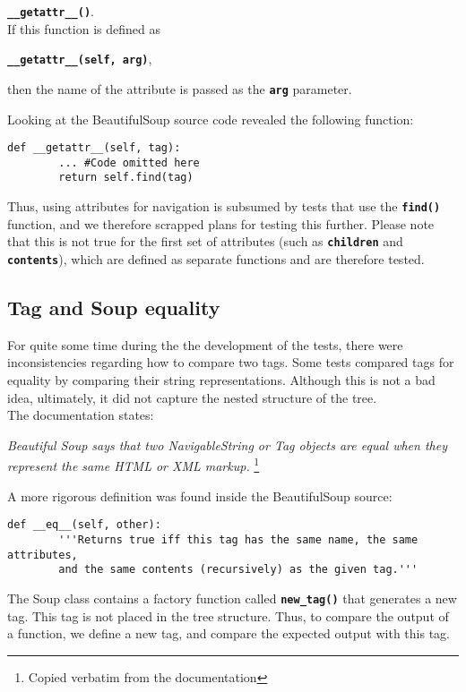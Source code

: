 \documentclass[10pt]{article}
\newcommand{\tbt}[1]{\texttt{\textbf{#1}}}
\begin{document}
\tbt{\_\_getattr\_\_()}. \\

If this function is defined as 

\tbt{\_\_getattr\_\_(self, arg)}, 

then the name of the attribute is passed as the \tbt{arg} parameter.

Looking at the BeautifulSoup source code revealed the following function:
\begin{lstlisting}[style=pythonstyle]
  def __getattr__(self, tag):
        ... #Code omitted here
        return self.find(tag)
\end{lstlisting}

Thus, using attributes for navigation is subsumed by tests that use the \tbt{find()} function, and we therefore scrapped plans for testing this further. Please note that this is not true for the first set of attributes (such as \tbt{children} and \tbt{contents}), which are defined as separate functions and are therefore tested.

\subsection{Tag and Soup equality}

For quite some time during the the development of the tests, there were inconsistencies regarding how to compare two tags. Some tests compared tags for equality by comparing their string representations. Although this is not a bad idea, ultimately, it did not capture the nested structure of the tree. \\

The documentation states: 
\begin{center}
  \textit{Beautiful Soup says that two NavigableString or Tag objects are equal when they represent the same HTML or XML markup.} \footnote{Copied verbatim from the documentation}
\end{center}

A more rigorous definition was found inside the BeautifulSoup source:
\begin{lstlisting}[style = pythonstyle]
  def __eq__(self, other):
        '''Returns true iff this tag has the same name, the same attributes,
        and the same contents (recursively) as the given tag.'''
\end{lstlisting}

The Soup class contains a factory function called \tbt{new\_tag()} that generates a new tag. This tag is not placed in the tree structure. Thus, to compare the output of a function, we define a new tag, and compare the expected output with this tag.
\end{document}
